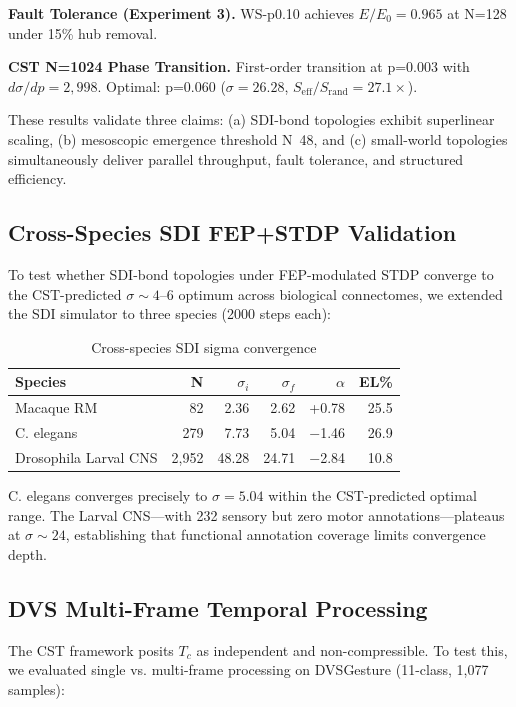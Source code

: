 \documentclass[12pt]{article}
\begin{document}
\textbf{Fault Tolerance (Experiment 3).} WS-p0.10 achieves
$E/E_0=0.965$ at N=128 under 15\% hub removal.

\textbf{CST N=1024 Phase Transition.} First-order transition at
p=0.003 with $d\sigma/dp = 2,998$. Optimal: p=0.060
($\sigma=26.28$, $S_{\text{eff}}/S_{\text{rand}}=27.1\times$).

These results validate three claims: (a) SDI-bond topologies exhibit
superlinear scaling, (b) mesoscopic emergence threshold N~48, and
(c) small-world topologies simultaneously deliver parallel throughput,
fault tolerance, and structured efficiency.

\subsection{Cross-Species SDI FEP+STDP Validation}

To test whether SDI-bond topologies under FEP-modulated STDP converge
to the CST-predicted $\sigma \sim 4$--$6$ optimum across biological
connectomes, we extended the SDI simulator to three species (2000
steps each):

\begin{table}[h]
\centering
\begin{tabular}{lrrrrr}
\toprule
Species & N & $\sigma_i$ & $\sigma_f$ & $\alpha$ & EL\% \\
\midrule
Macaque RM & 82 & 2.36 & 2.62 & +0.78 & 25.5 \\
C. elegans & 279 & 7.73 & 5.04 & $-$1.46 & 26.9 \\
Drosophila Larval CNS & 2,952 & 48.28 & 24.71 & $-$2.84 & 10.8 \\
\bottomrule
\end{tabular}
\caption{Cross-species SDI sigma convergence}
\end{table}

C. elegans converges precisely to $\sigma=5.04$ within the
CST-predicted optimal range. The Larval CNS---with 232 sensory but
zero motor annotations---plateaus at $\sigma \sim 24$, establishing
that functional annotation coverage limits convergence depth.

\subsection{DVS Multi-Frame Temporal Processing}

The CST framework posits $T_c$ as independent and non-compressible.
To test this, we evaluated single vs. multi-frame processing on
DVSGesture (11-class, 1,077 samples):
\end{document}
